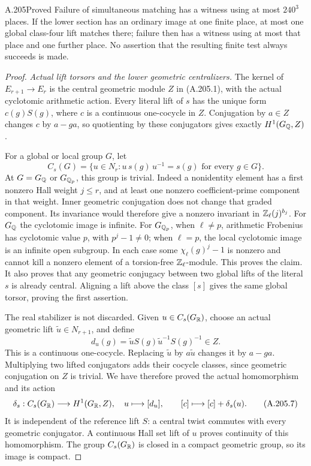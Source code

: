 \begin{statement}{A.205}{Proved}
Failure of simultaneous matching has a witness using at most
\(240^3\) places.  If the lower section has an ordinary
image at one finite place, at most one global class-four
lift matches there; failure then has a witness using at
most that place and one further place.  No assertion that
the resulting finite test always succeeds is made.
\end{statement}

\begin{proof}
\emph{Actual lift torsors and the lower geometric centralizers.}
The kernel of \(E_{r+1}\to E_r\) is the central geometric
module \(Z\) in (A.205.1), with the actual cyclotomic
arithmetic action.  Every literal lift of \(s\) has the
unique form \(c(g)S(g)\), where \(c\) is a continuous
one-cocycle in \(Z\).  Conjugation by \(a\in Z\)
changes \(c\) by \(a-ga\), so quotienting by these
conjugators gives exactly \(H^1(G_\mathbb Q,Z)\).

For a global or local group \(G\), let
\[
 C_s(G)=\{u\in N_r:u\,s(g)\,u^{-1}=s(g)
                                  \text{ for every }g\in G\}.
\tag{A.205.5}
\]
At \(G=G_\mathbb Q\) or \(G_{\mathbb Q_p}\), this group is trivial.
Indeed a nonidentity element has a first nonzero Hall weight
\(j\leq r\), and at least one nonzero coefficient-prime
component in that weight.  Inner geometric conjugation
does not change that graded component.  Its invariance
would therefore give a nonzero invariant in
\(\mathbb Z_\ell(j)^{b_j}\).
For \(G_\mathbb Q\) the cyclotomic image is infinite.
For \(G_{\mathbb Q_p}\), when \(\ell\ne p\), arithmetic
Frobenius has cyclotomic value \(p\), with \(p^j-1\ne0\);
when \(\ell=p\), the local cyclotomic image is an infinite
open subgroup.  In each case some \(\chi_\ell(g)^j-1\)
is nonzero and cannot kill a nonzero element of a torsion-free
\(\mathbb Z_\ell\)-module.  This proves the claim.
It also proves that any geometric conjugacy between two
global lifts of the literal \(s\) is already central.
Aligning a lift above the class \([s]\) gives the same
global torsor, proving the first assertion.

The real stabilizer is not discarded.  Given
\(u\in C_s(G_\mathbb R)\), choose an actual geometric lift
\(\widetilde u\in N_{r+1}\), and define
\[
 d_u(g)=\widetilde uS(g)\widetilde u^{-1}S(g)^{-1}\in Z.
\tag{A.205.6}
\]
This is a continuous one-cocycle.  Replacing
\(\widetilde u\) by \(a\widetilde u\) changes it
by \(a-ga\).  Multiplying two lifted conjugators adds
their cocycle classes, since geometric conjugation on
\(Z\) is trivial.  We have therefore proved the actual
homomorphism and its action
\[
 \delta_s:C_s(G_\mathbb R)\longrightarrow H^1(G_\mathbb R,Z),
       \quad u\longmapsto[d_u],\qquad
             [c]\longmapsto[c]+\delta_s(u).
\tag{A.205.7}
\]
It is independent of the reference lift \(S\): a central
twist commutes with every geometric conjugator.  A continuous
Hall set lift of \(u\) proves continuity of this homomorphism.
The group \(C_s(G_\mathbb R)\) is closed in a compact geometric
group, so its image is compact.


\end{proof}
